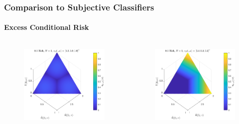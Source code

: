 \documentclass{beamer}
\begin{document}
\begin{frame}
\frametitle{Comparison to Subjective Classifiers}
\framesubtitle{Excess Conditional Risk}

\begin{columns}[c]

\begin{column}{.5\linewidth}

\begin{figure}
\centering
\includegraphics[width=1\linewidth]{Risk_cond_ex_01_Dir_theta__uni.pdf}
\label{fig:Risk_cond_ex_01_Dir_theta__uni}
\end{figure}

\end{column}

\begin{column}{.5\linewidth}

\begin{figure}
\centering
\includegraphics[width=1\linewidth]{Risk_cond_ex_01_Dir_theta__subj.pdf}
\label{fig:Risk_cond_ex_01_Dir_theta__subj}
\end{figure}


\end{column}
\end{columns}
\end{frame}
\end{document}

